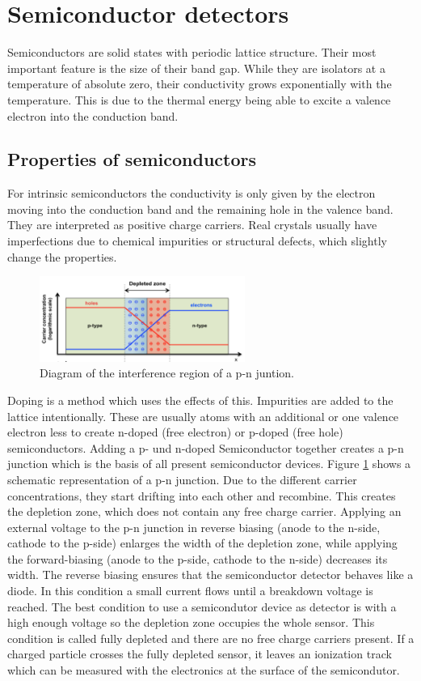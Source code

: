 \section{Semiconductor detectors \cite{semi}}
Semiconductors are solid states with periodic lattice structure. Their most important feature is the size of their band gap. While they are isolators at a temperature of absolute zero, their conductivity grows exponentially with the temperature. This is due to the thermal energy being able to excite a valence electron into the conduction band.
\subsection{Properties of semiconductors}
For intrinsic semiconductors the conductivity is only given by the electron moving into the conduction band and the remaining hole in the valence band. They are interpreted as positive charge carriers. Real crystals usually have imperfections due to chemical impurities or structural defects, which slightly change the properties. \\
\begin{figure}
	\center
	\includegraphics[width=0.6\textwidth]{graphics/pn.png}
	\caption{Diagram of the interference region of a p-n juntion. \cite{ali}}
	\label{fig:pn}
\end{figure}
Doping is a method which uses the effects of this. Impurities are added to the lattice intentionally. These are usually atoms with an additional or one valence electron less to create n-doped (free electron) or p-doped (free hole) semiconductors. Adding a p- und n-doped Semiconductor together creates a p-n junction which is the basis of all present semiconductor devices. Figure \ref{fig:pn} shows a schematic representation of a p-n junction. Due to the different carrier concentrations, they start drifting into each other and recombine. This creates the depletion zone, which does not contain any free charge carrier. Applying an external voltage to the p-n junction in reverse biasing (anode to the n-side, cathode to the p-side) enlarges the width of the depletion zone, while applying the forward-biasing (anode to the p-side, cathode to the n-side) decreases its width. The reverse biasing ensures that the semiconductor detector behaves like a diode. In this condition a small current flows until a breakdown voltage is reached. The best condition to use a semicondutor device as detector is with a high enough voltage so the depletion zone occupies the whole sensor. This condition is called fully depleted and there are no free charge carriers present. If a charged particle crosses the fully depleted sensor, it leaves an ionization track which can be measured with the electronics at the surface of the semicondutor. \\
